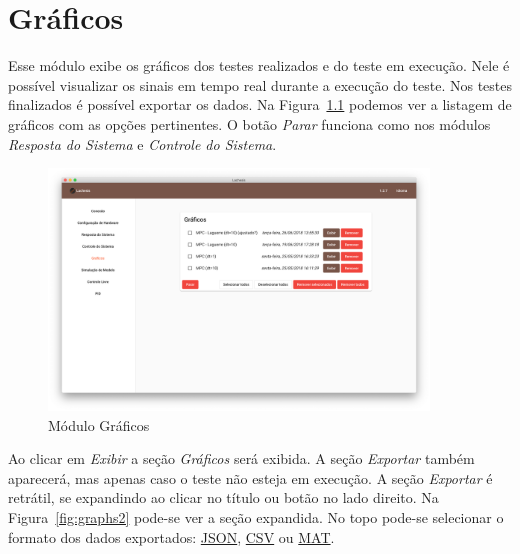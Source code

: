 
\chapter{Gráficos}%
\label{chapter:graficos}

Esse módulo exibe os gráficos dos testes realizados e do teste em execução. Nele
é possível visualizar os sinais em tempo real durante a execução do teste. Nos
testes finalizados é possível exportar os dados. Na Figura~\ref{fig:graphs1}
podemos ver a listagem de gráficos com as opções pertinentes. O botão
\textit{Parar} funciona como nos módulos \textit{Resposta do Sistema} e
\textit{Controle do Sistema}.

\begin{figure}[ht!]
    \centering
    \includegraphics[width=0.9\textwidth]{imgs/graphs1}
    \caption[Módulo Gráficos]{Módulo Gráficos}%
    \label{fig:graphs1}
\end{figure}

Ao clicar em \textit{Exibir} a seção \textit{Gráficos} será exibida. A seção
\textit{Exportar} também aparecerá, mas apenas caso o teste não esteja em
execução. A seção \textit{Exportar} é retrátil, se expandindo ao clicar no
título ou botão no lado direito. Na Figura~\ref{fig:graphs2} pode-se ver a seção
expandida. No topo pode-se selecionar o formato dos dados exportados:
\href{https://www.json.org/}{JSON},
\href{https://pt.wikipedia.org/wiki/Comma-separated_values}{CSV} ou
\href{https://www.mathworks.com/help/matlab/import_export/supported-file-formats.html}{MAT}.

